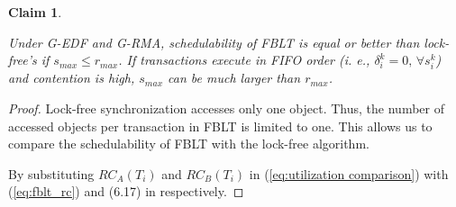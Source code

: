 \documentclass[prodmode,acmtecs]{acmsmall}
\newtheorem{clm}{Claim}
\begin{document}
\begin{compactenum}
\label{sec:fblt vs lock free}

\begin{clm}\label{clm:fblt_edf_lock-free}

Under G-EDF and G-RMA, schedulability of FBLT is equal or better than
lock-free's if $s_{max}\le r_{max}$. If transactions execute in FIFO
order (i. e., $\delta_{i}^{k}=0,\,\forall s_{i}^{k}$) and contention
is high, $s_{max}$ can be much larger than $r_{max}$.

\end{clm}

\begin{proof}

Lock-free synchronization \cite{key-5,stmconcurrencycontrol:emsoft11}
accesses only one object. Thus, the number of accessed objects per
transaction in FBLT is limited to one. This allows us to compare the
schedulability of FBLT with the lock-free algorithm.

By substituting $RC_{A}(T_{i})$ and $RC_{B}(T_{i})$ in (\ref{eq:utilization comparison})
with (\ref{eq:fblt_rc}) and (6.17) in \cite{shambake_phd_proposal}
respectively. 


\end{proof}
\end{compactenum}
\end{document}
